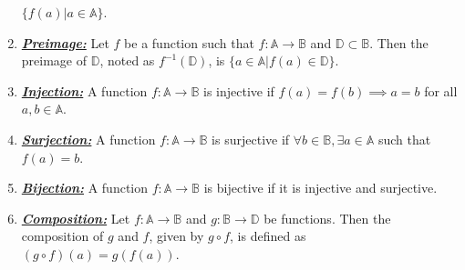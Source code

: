 \documentclass{article}
\newcommand{\deff}[1]{\textbf{\textit{\underline{#1}}}}
\newcommand{\seta}{\mathbb{A}}
\newcommand{\setb}{\mathbb{B}}
\newcommand{\setd}{\mathbb{D}}
\begin{document}
\begin{enumerate}
$\{f(a)|a\in\seta\}$.
\item \deff{Preimage:} Let $f$ be a function such that $f:\seta\to\setb$ and
$\setd\subset\setb$. Then the preimage of $\setd$, noted as $f^{-1}(\setd)$, is
$\{a\in\seta|f(a)\in\setd\}$.
\item \deff{Injection:} A function $f:\seta\to\setb$ is injective if
$f(a) = f(b)\implies a = b$ for all $a,b\in\seta$.
\item \deff{Surjection:} A function $f:\seta\to\setb$ is surjective if
$\forall b\in\setb, \exists a\in\seta$ such that $f(a) = b$.
\item \deff{Bijection:} A function $f:\seta\to\setb$ is bijective if it is
injective and surjective.
\item \deff{Composition:} Let $f:\seta\to\setb$ and $g:\setb\to\setd$ be
functions. Then the composition of $g$ and $f$, given by $g\circ f$, is
defined as $(g\circ f)(a) = g(f(a))$. 
\end{enumerate}
\end{document}
